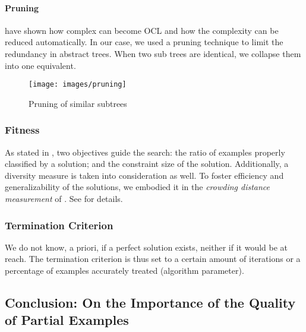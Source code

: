 \paragraph{Pruning}
\cite{cabot2007} have shown how complex can become OCL and how the complexity can be reduced automatically. In our case, we used a pruning technique to limit the redundancy in abstract trees.
When two sub trees are identical, we collapse them into one equivalent.
\begin{figure}[h]
	\centering
	\texttt{[image: images/pruning]}
	\caption{Pruning of similar subtrees}
	\label{fig:ap-pruning}
\end{figure}

\subsubsection{Fitness}
As stated in , two objectives guide the search: the ratio of examples properly classified by a solution; and the constraint size of the solution.
Additionally, a diversity measure is taken into consideration as well. To foster efficiency and generalizability of the solutions, we embodied it in the \textit{crowding distance measurement} of \nsga. See \cite{batot2018} for details.


\subsubsection{Termination Criterion}
We do not know, a priori, if a perfect solution exists, neither if it would be at reach. The termination criterion is thus set to a certain amount of iterations or a percentage of examples accurately treated (algorithm parameter).

\subsection{Conclusion: On the Importance of the Quality of Partial Examples}

